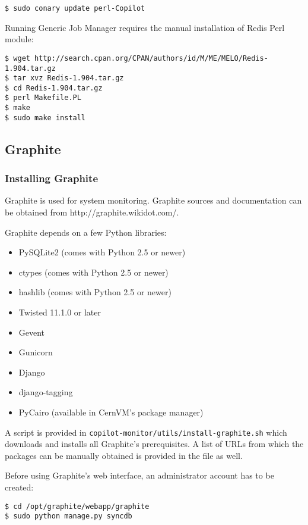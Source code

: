 \lstset{caption=Installing \copilot dependencies on CernVM}
\begin{lstlisting}
$ sudo conary update perl-Copilot
\end{lstlisting}

Running \copilot Generic Job Manager requires the manual installation of Redis Perl module:

\lstset{caption=Installing Redis Perl module}
\begin{lstlisting}
$ wget http://search.cpan.org/CPAN/authors/id/M/ME/MELO/Redis-1.904.tar.gz
$ tar xvz Redis-1.904.tar.gz
$ cd Redis-1.904.tar.gz
$ perl Makefile.PL
$ make
$ sudo make install
\end{lstlisting}

\subsection{Graphite}
\subsubsection{Installing Graphite}
Graphite is used for system monitoring. Graphite sources and documentation can be obtained from http://graphite.wikidot.com/.

Graphite depends on a few Python libraries:
\begin{itemize}
  \item PySQLite2 (comes with Python 2.5 or newer)
  \item ctypes (comes with Python 2.5 or newer)
  \item hashlib (comes with Python 2.5 or newer)
  \item Twisted 11.1.0 or later
  \item Gevent
  \item Gunicorn
  \item Django
  \item django-tagging
  \item PyCairo (available in CernVM's package manager)
\end{itemize}

A script is provided in \texttt{copilot-monitor/utils/install-graphite.sh} which downloads and installs all Graphite's prerequisites.
A list of URLs from which the packages can be manually obtained is provided in the file as well.

Before using Graphite's web interface, an administrator account has to be created:
\lstset{caption=Creating admin users}
\begin{lstlisting}
$ cd /opt/graphite/webapp/graphite
$ sudo python manage.py syncdb
\end{lstlisting}

